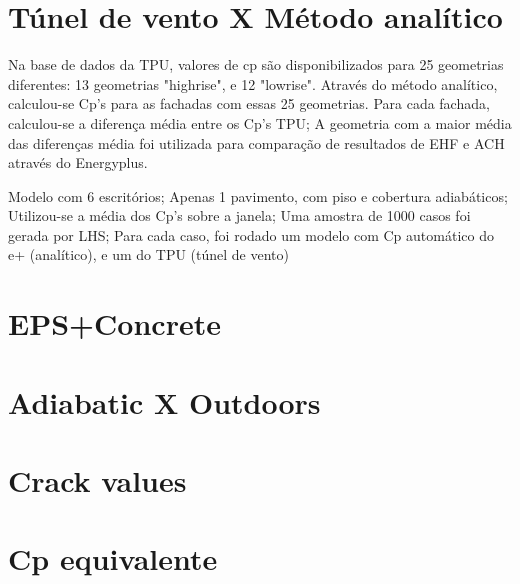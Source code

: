 \documentclass[12pt]{thesis}
\begin{document}
	\maketitle
	
	
	\section{Túnel de vento X Método analítico}\label{TPU}
	Na base de dados da TPU, valores de cp são disponibilizados para 25 geometrias diferentes: 13 geometrias "highrise", e 12 "lowrise".
	Através do método analítico, calculou-se Cp’s para as fachadas com essas 25 geometrias.
	Para cada fachada, calculou-se a diferença média entre os Cp’s TPU;
	A geometria com a maior média das diferenças média foi utilizada para comparação de resultados de EHF e ACH através do Energyplus.
	
	Modelo com 6 escritórios;
	Apenas 1 pavimento, com piso e cobertura adiabáticos;
	Utilizou-se a média dos Cp’s sobre a janela;
	Uma amostra de 1000 casos foi gerada por LHS;
	Para cada caso, foi rodado um modelo com Cp automático do e+ (analítico), e um do TPU (túnel de vento)
	
	\section{EPS+Concrete}
	
	\section{Adiabatic X Outdoors}
	
	\section{Crack values}
	
	\section{Cp equivalente}
		
\end{document}
